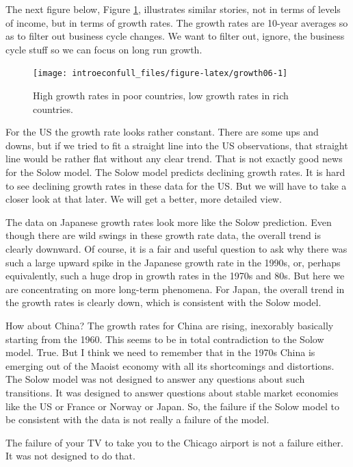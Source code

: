 \documentclass[
]{book}
\begin{document}
The next figure below, Figure \ref{fig:growth06}, illustrates similar stories, not in terms of levels of income, but in terms of growth rates. The growth rates are 10-year averages so as to filter out business cycle changes. We want to filter out, ignore, the business cycle stuff so we can focus on long run growth.

\begin{figure}

{\centering \texttt{[image: introeconfull\_files/figure-latex/growth06-1]} 

}

\caption{High growth rates in poor countries, low growth rates in rich countries.}\label{fig:growth06}
\end{figure}

For the US the growth rate looks rather constant. There are some ups and downs, but if we tried to fit a straight line into the US observations, that straight line would be rather flat without any clear trend. That is not exactly good news for the Solow model. The Solow model predicts declining growth rates. It is hard to see declining growth rates in these data for the US. But we will have to take a closer look at that later. We will get a better, more detailed view.

The data on Japanese growth rates look more like the Solow prediction. Even though there are wild swings in these growth rate data, the overall trend is clearly downward. Of course, it is a fair and useful question to ask why there was such a large upward spike in the Japanese growth rate in the 1990s, or, perhaps equivalently, such a huge drop in growth rates in the 1970s and 80s. But here we are concentrating on more long-term phenomena. For Japan, the overall trend in the growth rates is clearly down, which is consistent with the Solow model.

How about China? The growth rates for China are rising, inexorably basically starting from the 1960. This seems to be in total contradiction to the Solow model. True. But I think we need to remember that in the 1970s China is emerging out of the Maoist economy with all its shortcomings and distortions. The Solow model was not designed to answer any questions about such transitions. It was designed to answer questions about stable market economies like the US or France or Norway or Japan. So, the failure if the Solow model to be consistent with the data is not really a failure of the model.

The failure of your TV to take you to the Chicago airport is not a failure either. It was not designed to do that.
\end{document}
